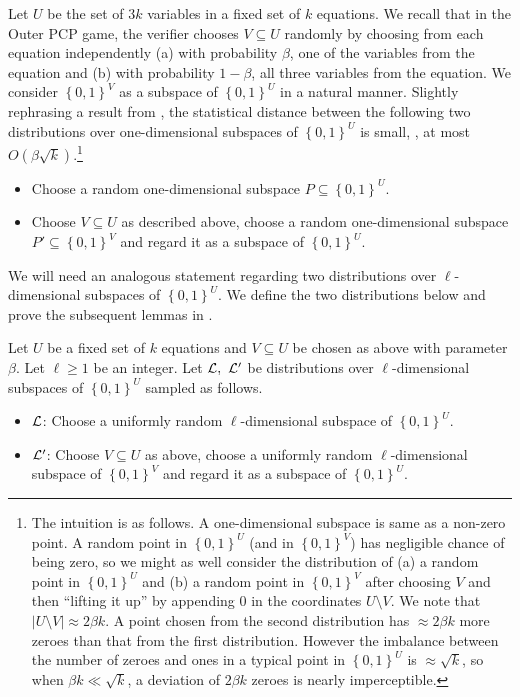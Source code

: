 \documentclass{toc}
\newcommand\set[1]{{\left\{ #1 \right\}}}
\newcommand\power[1]{\set{0,1}^{#1}}
\renewcommand\geq{\geqslant}
\begin{document}
\smallskip
Let $U$ be the set of $3k$ variables in a fixed set of $k$ equations.
We recall that in the Outer PCP game, the verifier chooses
$V\subseteq U$ randomly by choosing from each equation independently
(a) with probability $\beta$, one of the variables from the equation and
(b) with probability $1-\beta$, all three  variables from the equation.
We consider $\power{V}$ as a subspace of $\power{U}$ in a natural manner.
Slightly rephrasing a result from \cite{KS}, the statistical distance
between the following two distributions over one-dimensional subspaces of $\power{U}$ is small, \ie, at most $O(\beta \sqrt{k})$.\footnote{The intuition is as follows.
 A one-dimensional subspace is same as a non-zero point. A random point in $\power{U}$ (and in $\power{V}$) has negligible chance of being zero, so we
 might as well consider the distribution of (a) a random point in $\power{U}$ and (b) a random point in $\power{V}$ after choosing $V$ and then ``lifting it up''
 by appending $0$ in the coordinates $U \setminus V$. We note that $|U\setminus V| \approx 2\beta k$.
 A point chosen from the second distribution has  $\approx 2\beta k$ more zeroes
than that from the first distribution. However the imbalance between the number of zeroes and ones in a typical point in
$\power{U}$ is $\approx \sqrt{k}$, so when  $\beta k  \ll \sqrt{k}$, a deviation of $2\beta k$ zeroes is nearly imperceptible.}
\begin{itemize}
\item Choose a random one-dimensional subspace $P \subseteq \power{U}$.
\item Choose $V \subseteq U$ as described above, choose a random one-dimensional subspace $P' \subseteq \power{V}$ and regard it as a
      subspace of $\power{U}$.
\end{itemize}
We will need an analogous statement regarding two distributions over $\ell$-dimensional subspaces of $\power{U}$. We define the two distributions
below and prove the subsequent lemmas in .
\begin{definition}\label{def:covering_dist} Let $U$ be a fixed set of $k$ equations and $V \subseteq U$ be chosen as above with
parameter $\beta$. Let $\ell \geq 1$ be an integer. Let ${\cal L}, ~{\cal L}'$ be distributions over $\ell$-dimensional subspaces of $\power{U}$ sampled as follows.
\begin{itemize}
\item ${\cal L}$: Choose  a uniformly random $\ell$-dimensional subspace of $\power{U}$.
\item ${\cal L'}$: Choose $V \subseteq U$ as above,  choose  a uniformly random $\ell$-dimensional subspace of $\power{V}$ and regard it as a
      subspace of $\power{U}$.
\end{itemize}
\end{definition}
\end{document}
